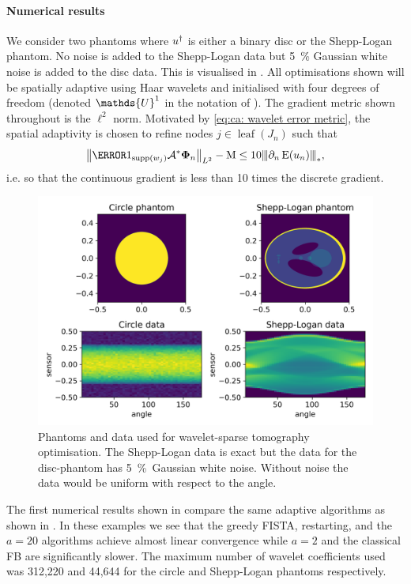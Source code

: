 \documentclass[10pt,a4paper,onecolumn]{article}
\numberwithin{equation}{section}
\let\F\mathds\let\C\mathcal\newcommand{\R}{\F{R}}\newcommand{\A}{\C{A}}
\newcommand{\Norm}[1]{{\left\vert\kern-0.25ex\left\vert\kern-0.25ex\left\vert #1 \right\vert\kern-0.25ex\right\vert\kern-0.25ex\right\vert}}
\newcommand{\norm}[1]{{\left\lVert #1 \right\rVert}}
\newcommand{\op}[1]{\operatorname{#1}}\newcommand{\overtext}[2]{\stackrel{\text{#1}}{#2}}
\renewcommand{\vec}{\mathbf}
\newcommand*{\Func}[1]{%
	\IfEqCase{#1}{%
		{0}{\op{E}}%
		{1}{\op{F}}%
		{2}{\op{G}}%
		{3}{\op{H}}%
	}[\op{F}#1]%
}
\newcommand*{\varf}[1]{%
	\IfEqCase{#1}{%
		{0}{u}%
		{1}{v}%
		{2}{w}%
	}[u#1]%
}
\newcommand*{\spcf}[1]{%
	\IfEqCase{#1}{%
		{0}{\F{U}}%
		{1}{\F{V}}%
		{2}{\F{W}}%
	}[\F{U}#1]%
}
\newcommand*{\vard}[1]{%
	\IfEqCase{#1}{%
		{0}{\varphi}%
		{1}{\psi}%
	}[\varphi #1]%
}
\newcommand*{\data}[1]{%
	\IfEqCase{#1}{%
		{0}{\eta}%
		{1}{\nu}%
	}[g]%
}
\newcommand*{\vvard}[1]{\vec{\vard{#1}}}\newcommand*{\vdata}[1]{\vec{\data{#1}}}
\begin{document}
\paragraph{Numerical results}
We consider two phantoms where $\varf0^\dagger$ is either a binary disc or the Shepp-Logan phantom. No noise is added to the Shepp-Logan data but \SI{5}{\percent} Gaussian white noise is added to the disc data. This is visualised in . All optimisations shown will be spatially adaptive using Haar wavelets and initialised with four degrees of freedom (denoted $\spcf0^1$ in the notation of ). The gradient metric shown throughout is the $\ell^2$ norm. Motivated by \eqref{eq:ca: wavelet error metric}, the spatial adaptivity is chosen to refine nodes $j\in\op{leaf}(J_n)$ such that 
$$ \norm{\1_{\supp(w_j)}\A^*\vvard0_n}_{L^2} -\mu  \leq 10\Norm{\partial_n\Func0(\varf0_n)}_*,$$
i.e. so that the continuous gradient is less than 10 times the discrete gradient.

\begin{figure}[H]\centering
	\includegraphics[width=.84\textwidth]{haar_data}
	\caption{Phantoms and data used for wavelet-sparse tomography optimisation. The Shepp-Logan data is exact but the data for the disc-phantom has \SI{5}{\percent}\ Gaussian white noise. Without noise the data would be uniform with respect to the angle.}\label{fig:ca: haar data}
\end{figure}

The first numerical results shown in  compare the same adaptive algorithms as shown in . In these examples we see that the greedy FISTA, restarting, and the $a=20$ algorithms achieve almost linear convergence while $a=2$ and the classical FB are significantly slower. The maximum number of wavelet coefficients used was 312,220 and 44,644 for the circle and Shepp-Logan phantoms respectively.
\end{document}
